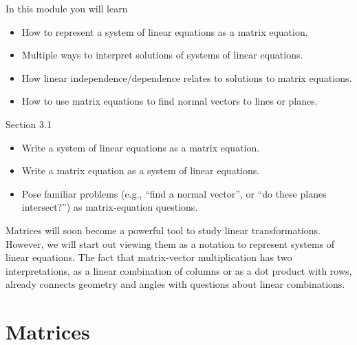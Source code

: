\documentclass{problemset}
\newcommand{\bookonlynewpage}{\begin{bookonly}\newpage\end{bookonly}}
\begin{document}
\begin{module}

	In this module you will learn
	\begin{itemize}
		\item How to represent a system of linear equations as a matrix equation.
		\item Multiple ways to interpret solutions of systems of linear equations.
		\item How linear independence/dependence relates to solutions to matrix equations.
		\item How to use matrix equations to find normal vectors to lines or planes.
	\end{itemize}
	
	
\end{module}
\begin{lesson}

	Section 3.1

	\begin{itemize}
		\item Write a system of linear equations as a matrix equation.
		\item Write a matrix equation as a system of linear equations.
		\item Pose familiar problems (e.g., ``find a normal vector'', or
			``do these planes intersect\mbox{?}'') as matrix-equation
			questions.
	\end{itemize}

	Matrices will soon become a powerful tool to study linear transformations.
	However, we will start out viewing them as a notation to represent
	systems of linear equations. The fact that matrix-vector multiplication
	has two interpretations, as a linear combination of columns or as a dot product
	with rows, already connects geometry and angles with questions about linear combinations.

\end{lesson}
	\bookonlynewpage
\section*{Matrices}
\end{document}
